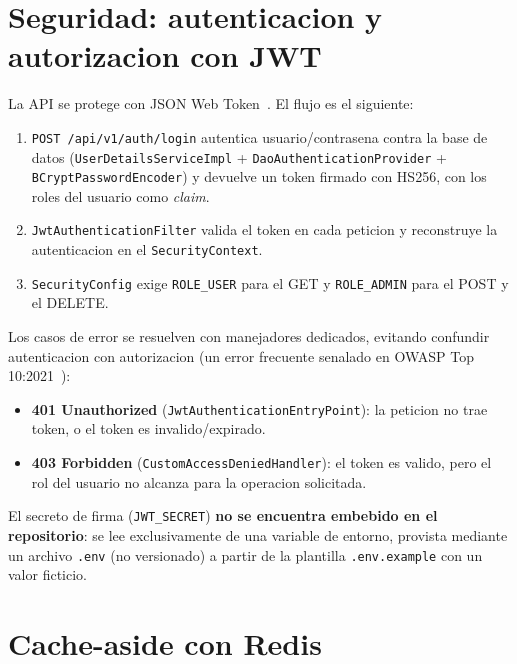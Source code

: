 \documentclass[11pt,a4paper]{article}
\begin{document}
\section{Seguridad: autenticacion y autorizacion con JWT}

La API se protege con JSON Web Token~\cite{rfc7519}. El flujo es el
siguiente:

\begin{enumerate}
    \item \texttt{POST /api/v1/auth/login} autentica usuario/contrasena
          contra la base de datos (\texttt{UserDetailsServiceImpl} +
          \texttt{DaoAuthenticationProvider} + \texttt{BCryptPasswordEncoder})
          y devuelve un token firmado con HS256, con los roles del usuario
          como \emph{claim}.
    \item \texttt{JwtAuthenticationFilter} valida el token en cada peticion
          y reconstruye la autenticacion en el \texttt{SecurityContext}.
    \item \texttt{SecurityConfig} exige \texttt{ROLE\_USER} para el GET y
          \texttt{ROLE\_ADMIN} para el POST y el DELETE.
\end{enumerate}

Los casos de error se resuelven con manejadores dedicados, evitando
confundir autenticacion con autorizacion (un error frecuente senalado en
OWASP Top 10:2021~\cite{owasp2021}):

\begin{itemize}
    \item \textbf{401 Unauthorized} (\texttt{JwtAuthenticationEntryPoint}):
          la peticion no trae token, o el token es invalido/expirado.
    \item \textbf{403 Forbidden} (\texttt{CustomAccessDeniedHandler}): el
          token es valido, pero el rol del usuario no alcanza para la
          operacion solicitada.
\end{itemize}

El secreto de firma (\texttt{JWT\_SECRET}) \textbf{no se encuentra
embebido en el repositorio}: se lee exclusivamente de una variable de
entorno, provista mediante un archivo \texttt{.env} (no versionado) a
partir de la plantilla \texttt{.env.example} con un valor ficticio.

\section{Cache-aside con Redis}
\end{document}
